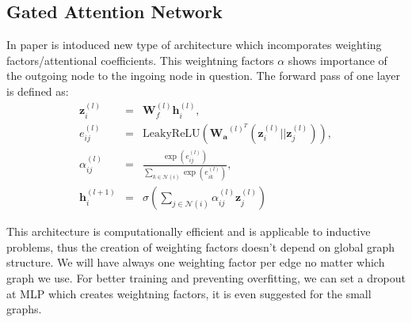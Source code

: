 \subsection{Gated Attention Network}
In paper \cite{gat} is intoduced new type of architecture which incomporates weighting factors/attentional coefficients. This weightning factors $\alpha$ shows importance of the outgoing node  to the  ingoing node in question. 
The forward pass of one layer is defined as:
\begin{eqnarray}
\mathbf{z}_i^{(l)}&=&\mathbf{W}_f^{(l)}\mathbf{h}_i^{(l)}, \\
e_{ij}^{(l)}&=&\text{LeakyReLU}(\mathbf{W_a}^{(l)^T}(\mathbf{z}_i^{(l)}||\mathbf{z}_j^{(l)})),\\
\alpha_{ij}^{(l)}&=&\frac{\exp(e_{ij}^{(l)})}{\sum_{k\in \mathcal{N}(i)}^{}\exp(e_{ik}^{(l)})},\\
\mathbf{h}_i^{(l+1)}&=&\sigma\left(\sum_{j\in \mathcal{N}(i)} {\alpha^{(l)}_{ij} \mathbf{z}^{(l)}_j }\right)
\end{eqnarray}

This architecture is computationally efficient and  is applicable to inductive problems, thus the creation of weighting factors doesn't depend on global graph structure. We will have always one weighting factor per edge no matter which graph we use.%
For better training and preventing overfitting, we can set a dropout at MLP which creates weightning factors\cite{att}, it is even suggested for  the small graphs.












